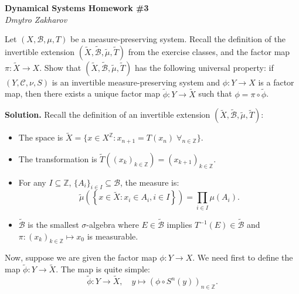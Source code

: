 \documentclass{template}
\begin{document}
\begin{center}
    \Large \textcolor{blue!70!black}{\textbf{Dynamical Systems Homework \#3}} \\
    \normalsize \textit{Dmytro Zakharov}
\end{center}

\begin{problem}[Exercise 1]
    Let $(X,\mathcal{B},\mu,T)$ be a measure-preserving system. Recall the
    definition of the invertible extension $(\widetilde{X},
    \widetilde{\mathcal{B}}, \widetilde{\mu}, \widetilde{T})$ from the exercise
    classes, and the factor map $\pi: \widetilde{X} \to X$. Show that
    $(\widetilde{X}, \widetilde{\mathcal{B}}, \widetilde{\mu}, \widetilde{T})$
    has the following universal property: if $(Y,\mathcal{C},\nu,S)$ is an 
    invertible measure-preserving system and $\phi: Y \to X$ is a factor map,
    then there exists a unique factor map $\widetilde{\phi}: Y \to \widetilde{X}$
    such that $\phi = \pi \circ \widetilde{\phi}$.
\end{problem}

\textbf{Solution.} Recall the definition of an invertible extension
$(\widetilde{X}, \widetilde{\mathcal{B}}, \widetilde{\mu}, \widetilde{T})$:
\begin{itemize}
    \item The space is $\widetilde{X} = \{x \in X^{\mathbb{Z}}: x_{n+1} = T(x_n) \; \forall_{n \in \mathbb{Z}}\}$.
    \item The transformation is $\widetilde{T}((x_k)_{k \in \mathbb{Z}}) = (x_{k+1})_{k \in \mathbb{Z}}$.
    \item For any $I \subseteq \mathbb{Z}$, $\{A_i\}_{i \in I} \subseteq \mathcal{B}$, the measure is:
    \begin{equation*}
        \widetilde{\mu}\left(\left\{ x \in \widetilde{X}: x_i \in A_i, i \in I \right\}\right) = \prod_{i \in I}\mu(A_i).
    \end{equation*}
    \item $\widetilde{\mathcal{B}}$ is the smallest $\sigma$-algebra where $E \in \widetilde{\mathcal{B}}$ implies $T^{-1}(E) \in \widetilde{\mathcal{B}}$ and $\pi: (x_k)_{k \in \mathbb{Z}} \mapsto x_0$ is measurable.
\end{itemize}

Now, suppose we are given the factor map $\phi: Y \to X$. We need first to define 
the map $\widetilde{\phi}: Y \to \widetilde{X}$. The map is quite simple:
\begin{equation*}
    \widetilde{\phi}: Y \to \widetilde{X}, \quad y \mapsto (\phi \circ S^n(y))_{n \in \mathbb{Z}}.
\end{equation*}
\end{document}
